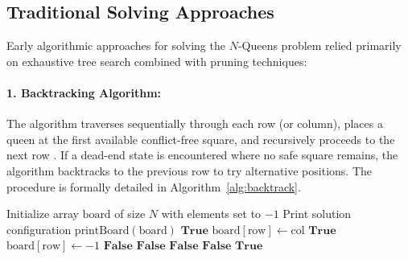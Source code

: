 \documentclass[a4paper,fleqn]{cas-sc}
\begin{document}
\subsection{Traditional Solving Approaches}
\label{subsec:traditional}
Early algorithmic approaches for solving the $N$-Queens problem relied primarily on exhaustive tree search combined with pruning techniques:

\paragraph{1. Backtracking Algorithm:}
The algorithm traverses sequentially through each row (or column), places a queen at the first available conflict-free square, and recursively proceeds to the next row \cite{golomb1965backtrack}. If a dead-end state is encountered where no safe square remains, the algorithm backtracks to the previous row to try alternative positions. The procedure is formally detailed in Algorithm~\ref{alg:backtrack}.

\begin{algorithm}[htbp]
\caption{Solving the $N$-Queens Problem using Backtracking}
\label{alg:backtrack}
\begin{algorithmic}[1]
    \State Initialize array $\text{board}$ of size $N$ with elements set to $-1$
    \State {}
\EndFunction
\Statex
{}
        \State Print solution configuration $\text{printBoard}(\text{board})$
        \State \Return $\mathbf{True}$
    \EndIf
            \State $\text{board}[\text{row}] \gets \text{col}$ 
                \State \Return $\mathbf{True}$
            \EndIf
            \State $\text{board}[\text{row}] \gets -1$ 
        \EndIf
    \EndFor
    \State \Return $\mathbf{False}$
\EndFunction
\Statex
{}
         \Return $\mathbf{False}$ 
        \EndIf
         \Return $\mathbf{False}$ 
        \EndIf
         \Return $\mathbf{False}$ 
        \EndIf
    \EndFor
    \State \Return $\mathbf{True}$
\EndFunction
\end{algorithmic}
\end{algorithm}
\end{document}
